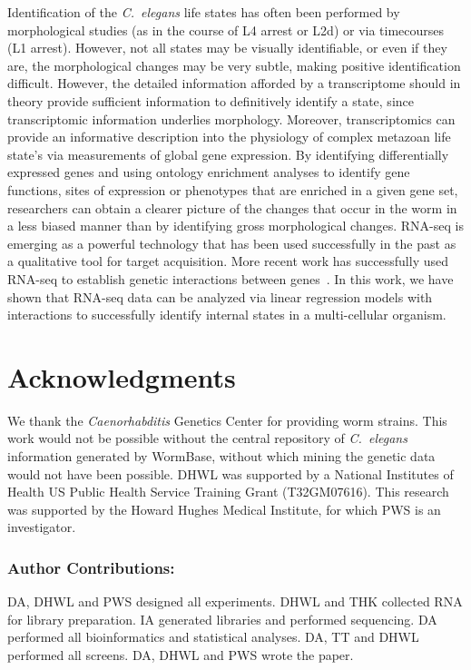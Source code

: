 \documentclass[10pt,letterpaper,twocolumn]{article}
\newcommand{\cel}{\emph{C.~elegans}}
\begin{document}
Identification of the \cel{} life states has often been performed by
morphological studies (as in the course of L4 arrest or L2d) or via
timecourses (L1 arrest). However, not all states may be visually identifiable,
or even if they are, the morphological changes may be very subtle, making
positive identification difficult. However, the detailed information afforded
by a transcriptome should in theory provide sufficient information to
definitively identify a state, since transcriptomic information underlies
morphology. Moreover, transcriptomics can provide an informative description
into the physiology of complex metazoan life state's via measurements of global
gene expression. By identifying differentially expressed genes and using
ontology enrichment analyses to identify gene functions, sites of expression
or phenotypes that are enriched in a given gene set, researchers can obtain a
clearer picture of the changes that occur in the worm in a less biased manner
than by identifying gross morphological changes.
RNA-seq is emerging as a powerful technology that has been used successfully in
the past as a qualitative tool for target acquisition. More recent work has
successfully used RNA-seq to establish genetic interactions between
genes~\cite{}. In this work, we have shown that RNA-seq data can be analyzed via
linear regression models with interactions to successfully identify internal
states in a multi-cellular organism.

\section*{Acknowledgments}

We thank the \emph{Caenorhabditis} Genetics Center for providing worm strains.
This work would not be possible without the central repository of \cel{}
information generated by WormBase, without which mining the genetic data would
not have been possible. DHWL was supported by a National Institutes of Health
US Public Health Service Training Grant (T32GM07616). This research was
supported by the Howard Hughes Medical Institute, for which PWS is an
investigator.

\subsubsection*{Author Contributions:}
DA, DHWL and PWS designed all experiments. DHWL and THK collected RNA for
library preparation. IA generated libraries and performed sequencing.
DA performed all bioinformatics and statistical analyses.
DA, TT and DHWL performed all screens. DA, DHWL and PWS wrote the paper.

\nolinenumbers{}




\end{document}
